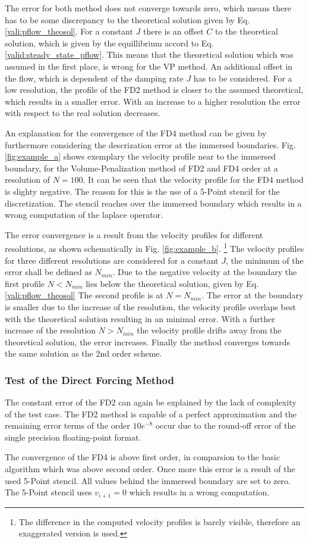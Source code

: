 The error for both method does not converge towards zero, which means there has to be some discrepancy to the theoretical solution given by
Eq. \ref{vali:pflow_theosol}.
For a constant $J$ there is an offset $C$ to the theoretical solution,
which is given by the equillibrium accord to Eq.  \ref{valid:steady_state_pflow}.
This means that the theoretical solution which was assumed in the first place, is wrong for the VP method.
An additional offset in the flow, which is dependent of the damping rate $J$ has to be considered.
For a low resolution, the profile of the FD2  method is closer to the assumed theoretical, which results in a smaller
error. With an increase to a higher resolution the error with respect to the real solution decreases.

An explanation for the convergence of the FD4 method can be given by furthermore considering the descrization error at the immersed boundaries.
Fig. \ref{fig:example_a} shows exemplary the velocity profile near to the immersed boundary, for the Volume-Penalization method of FD2 and FD4 order
at a resolution of $N=100$.
It can be seen that the velocity profile for the FD4  method  is slighty negative.
The reason for this is the use of a 5-Point stencil for the discretization.
The stencil reaches over the immersed boundary which results in a wrong computation of the laplace operator.

The  error convergence is a result from  the velocity profiles for different resolutions,
as shown schematically in Fig. \ref{fig:example_b}.
\footnote{The difference in the computed velocity profiles is barely visible, therefore an exaggerated version is used.}
The velocity profiles for three different resolutions are considered for a constant $J$,
the minimum of the error shall be defined as $N_{min}$.
Due to the negative velocity at the boundary the first profile $N<N_{min}$ lies below the theoretical solution,
given by Eq. \ref{vali:pflow_theosol}
The second profile is at $N=N_{min}$. The error at the boundary is smaller due to the increase of the resolution,
the velocity profile overlaps best with the theoretical solution resulting in an minimal error.
With a further increase of the resolution  $N>N_{min}$ the velocity profile drifts away from the theoretical solution,
the error increases.  Finally the method converges towards the same solution as the 2nd order scheme.


\subsubsection{Test of the Direct Forcing Method}

The constant error of the FD2 can again be explained by the lack of complexity of the test case.
The FD2 method is capable of a perfect approximation and
the remaining error terms of the order $10e^{-8}$
occur due to the round-off error of the single precision floating-point format.

The convergence of the FD4 is above first order, in comparsion to the basic algorithm which was above second order.
Once more this error is a result of the used 5-Point stencil.  All values behind the immersed boundary are set
to zero. The 5-Point stencil uses $v_{i+1} = 0$ which results in a wrong computation.


